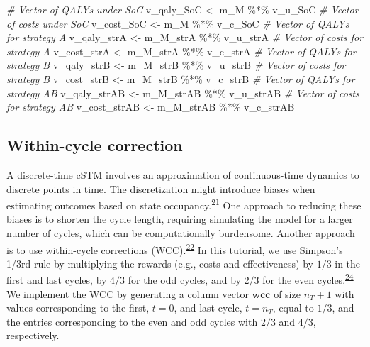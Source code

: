 \documentclass[
]{article}
\newenvironment{Shaded}{\begin{snugshade}}{\end{snugshade}}
\newcommand{\CommentTok}[1]{\textcolor[rgb]{0.56,0.35,0.01}{\textit{#1}}}
\newcommand{\NormalTok}[1]{#1}
\newcommand{\OtherTok}[1]{\textcolor[rgb]{0.56,0.35,0.01}{#1}}
\newcommand{\SpecialCharTok}[1]{\textcolor[rgb]{0.00,0.00,0.00}{#1}}
\begin{document}
\begin{Shaded}
\begin{Highlighting}[]
\CommentTok{\# Vector of QALYs under SoC}
\NormalTok{v\_qaly\_SoC }\OtherTok{\textless{}{-}}\NormalTok{ m\_M }\SpecialCharTok{\%*\%}\NormalTok{ v\_u\_SoC}
\CommentTok{\# Vector of costs under SoC}
\NormalTok{v\_cost\_SoC }\OtherTok{\textless{}{-}}\NormalTok{ m\_M }\SpecialCharTok{\%*\%}\NormalTok{ v\_c\_SoC}
\CommentTok{\# Vector of QALYs for strategy A}
\NormalTok{v\_qaly\_strA }\OtherTok{\textless{}{-}}\NormalTok{ m\_M\_strA }\SpecialCharTok{\%*\%}\NormalTok{ v\_u\_strA}
\CommentTok{\# Vector of costs for strategy A}
\NormalTok{v\_cost\_strA }\OtherTok{\textless{}{-}}\NormalTok{ m\_M\_strA }\SpecialCharTok{\%*\%}\NormalTok{ v\_c\_strA}
\CommentTok{\# Vector of QALYs for strategy B}
\NormalTok{v\_qaly\_strB }\OtherTok{\textless{}{-}}\NormalTok{ m\_M\_strB }\SpecialCharTok{\%*\%}\NormalTok{ v\_u\_strB}
\CommentTok{\# Vector of costs for strategy B}
\NormalTok{v\_cost\_strB }\OtherTok{\textless{}{-}}\NormalTok{ m\_M\_strB }\SpecialCharTok{\%*\%}\NormalTok{ v\_c\_strB}
\CommentTok{\# Vector of QALYs for strategy AB}
\NormalTok{v\_qaly\_strAB }\OtherTok{\textless{}{-}}\NormalTok{ m\_M\_strAB }\SpecialCharTok{\%*\%}\NormalTok{ v\_u\_strAB}
\CommentTok{\# Vector of costs for strategy AB}
\NormalTok{v\_cost\_strAB }\OtherTok{\textless{}{-}}\NormalTok{ m\_M\_strAB }\SpecialCharTok{\%*\%}\NormalTok{ v\_c\_strAB}
\end{Highlighting}
\end{Shaded}

\hypertarget{within-cycle-correction}{%
\subsection{Within-cycle correction}\label{within-cycle-correction}}

A discrete-time cSTM involves an approximation of continuous-time dynamics to discrete points in time. The discretization might introduce biases when estimating outcomes based on state occupancy.\textsuperscript{\protect\hyperlink{ref-VanRosmalen2013}{21}} One approach to reducing these biases is to shorten the cycle length, requiring simulating the model for a larger number of cycles, which can be computationally burdensome. Another approach is to use within-cycle corrections (WCC).\textsuperscript{\protect\hyperlink{ref-Hunink2014}{22}} In this tutorial, we use Simpson's 1/3rd rule by multiplying the rewards (e.g., costs and effectiveness) by \(1/3\) in the first and last cycles, by \(4/3\) for the odd cycles, and by \(2/3\) for the even cycles.\textsuperscript{\protect\hyperlink{ref-Elbasha2016a}{24}} We implement the WCC by generating a column vector \(\mathbf{wcc}\) of size \(n_T+1\) with values corresponding to the first, \(t=0\), and last cycle, \(t= n_T\), equal to \(1/3\), and the entries corresponding to the even and odd cycles with \(2/3\) and \(4/3\), respectively.
\end{document}
